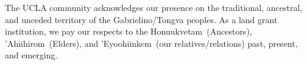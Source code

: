 
\vspace*{\fill}
\begin{center}
    \begin{minipage}{\linewidth}
        The UCLA community acknowledges our presence on the traditional, ancestral, and unceded territory of the Gabrielino/Tongva peoples.
        As a land grant institution, we pay our respects to the Honuukvetam~(Ancestors), 'Ahiihirom~(Elders), and 'Eyoohiinkem~(our relatives/relations) past, present, and emerging.
    \end{minipage}
\end{center}
\vspace*{\fill}
